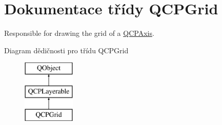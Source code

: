 \hypertarget{classQCPGrid}{}\section{Dokumentace třídy Q\+C\+P\+Grid}
\label{classQCPGrid}


Responsible for drawing the grid of a \hyperlink{classQCPAxis}{Q\+C\+P\+Axis}.  


Diagram dědičnosti pro třídu Q\+C\+P\+Grid\begin{figure}[H]
\begin{center}
\leavevmode
\includegraphics[height=3.000000cm]{classQCPGrid}
\end{center}
\end{figure}
